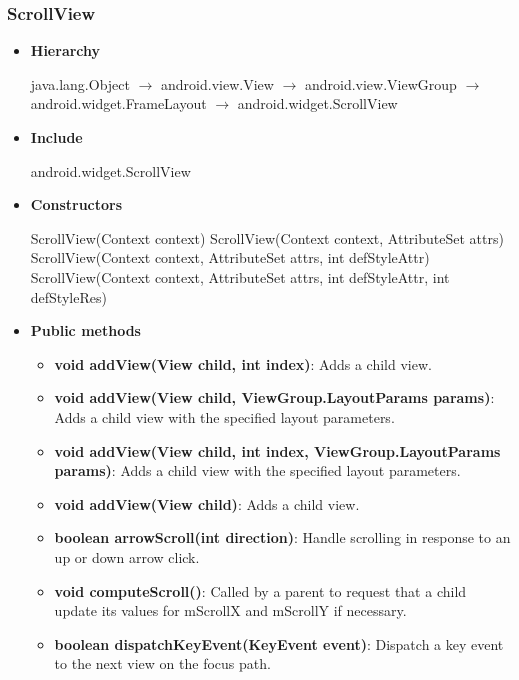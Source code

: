\documentclass{report}
\begin{document}
\begin{itemize}
    \subsubsection{ScrollView}
    \begin{itemize}
        \item \textbf{Hierarchy}
            \begin{center}
                java.lang.Object $\to$	android.view.View $\to$	android.view.ViewGroup $\to$	android.widget.FrameLayout $\to$	android.widget.ScrollView
            \end{center}
        \item \textbf{Include}
            \bigbreak \noindent 
            \begin{javacode}
                android.widget.ScrollView
            \end{javacode}
        \item \textbf{Constructors}
            \bigbreak \noindent 
            \begin{javacode}
                ScrollView(Context context)
                ScrollView(Context context, AttributeSet attrs)
                ScrollView(Context context, AttributeSet attrs, int defStyleAttr)
                ScrollView(Context context, AttributeSet attrs, int defStyleAttr, int defStyleRes)
            \end{javacode}
        \item \textbf{Public methods}
            \begin{itemize}
                \item \textbf{void	addView(View child, int index)}: Adds a child view.
                \item \textbf{void	addView(View child, ViewGroup.LayoutParams params)}: Adds a child view with the specified layout parameters.
                \item \textbf{void	addView(View child, int index, ViewGroup.LayoutParams params)}: Adds a child view with the specified layout parameters.
                \item \textbf{void	addView(View child)}: Adds a child view.
                \item \textbf{boolean	arrowScroll(int direction)}: Handle scrolling in response to an up or down arrow click.
                \item \textbf{void	computeScroll()}: Called by a parent to request that a child update its values for mScrollX and mScrollY if necessary.
                \item \textbf{boolean	dispatchKeyEvent(KeyEvent event)}: Dispatch a key event to the next view on the focus path.

\end{itemize}
\end{itemize}
\end{itemize}
\end{document}
